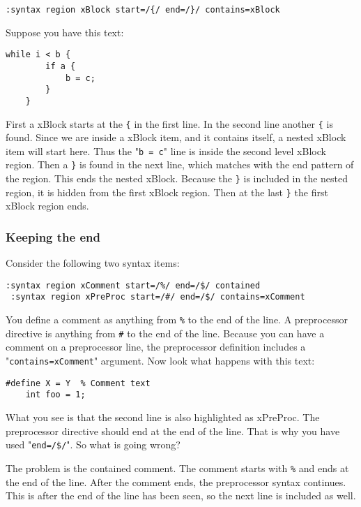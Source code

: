 \begin{Verbatim}[samepage=true]
 :syntax region xBlock start=/{/ end=/}/ contains=xBlock
\end{Verbatim}

Suppose you have this text:

\begin{Verbatim}[samepage=true]
    while i < b { 
        if a { 
            b = c; 
        } 
    } 
\end{Verbatim}

First a xBlock starts at the \texttt{\{} in the first line.
In the second line another \texttt{\{} is found.
Since we are inside a xBlock item, and it contains itself, a nested xBlock item will start here.
Thus the "\texttt{b = c}" line is inside the second level xBlock region.
Then a \texttt{\}} is found in the next line, which matches with the end pattern of the region.
This ends the nested xBlock.
Because the \texttt{\}} is included in the nested region, it is hidden from the first xBlock region.
Then at the last \texttt{\}} the first xBlock region ends.

\subsubsection{Keeping the end}
Consider the following two syntax items:

\begin{Verbatim}[samepage=true]
 :syntax region xComment start=/%/ end=/$/ contained
 :syntax region xPreProc start=/#/ end=/$/ contains=xComment
\end{Verbatim}

You define a comment as anything from \texttt{\%} to the end of the line.
A preprocessor directive is anything from \texttt{\#} to the end of the line.
Because you can have a comment on a preprocessor line, the preprocessor definition includes a "\texttt{contains=xComment}" argument.
Now look what happens with this text:

\begin{Verbatim}[samepage=true]
    #define X = Y  % Comment text 
    int foo = 1; 
\end{Verbatim}

What you see is that the second line is also highlighted as xPreProc.
The preprocessor directive should end at the end of the line.
That is why you have used "\texttt{end=/\$/}".
So what is going wrong?

The problem is the contained comment.
The comment starts with \texttt{\%} and ends at the end of the line.
After the comment ends, the preprocessor syntax continues.
This is after the end of the line has been seen, so the next line is included as well.

